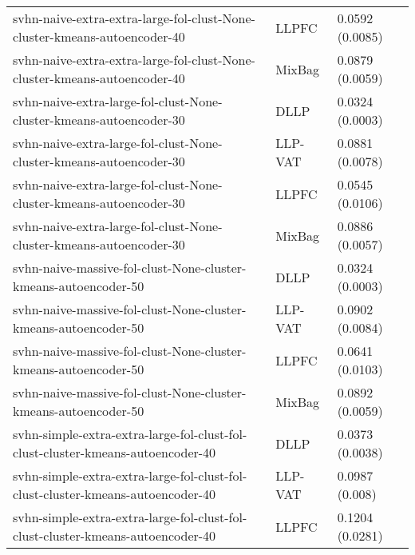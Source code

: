 \begin{longtable}{lll}
                                    svhn-naive-extra-extra-large-fol-clust-None-cluster-kmeans-autoencoder-40 &     LLPFC &                       0.0592 (0.0085) \\
                                    svhn-naive-extra-extra-large-fol-clust-None-cluster-kmeans-autoencoder-40 &    MixBag &                       0.0879 (0.0059) \\
                                          svhn-naive-extra-large-fol-clust-None-cluster-kmeans-autoencoder-30 &      DLLP &                       0.0324 (0.0003) \\
                                          svhn-naive-extra-large-fol-clust-None-cluster-kmeans-autoencoder-30 &   LLP-VAT &                       0.0881 (0.0078) \\
                                          svhn-naive-extra-large-fol-clust-None-cluster-kmeans-autoencoder-30 &     LLPFC &                       0.0545 (0.0106) \\
                                          svhn-naive-extra-large-fol-clust-None-cluster-kmeans-autoencoder-30 &    MixBag &                       0.0886 (0.0057) \\
                                              svhn-naive-massive-fol-clust-None-cluster-kmeans-autoencoder-50 &      DLLP &                       0.0324 (0.0003) \\
                                              svhn-naive-massive-fol-clust-None-cluster-kmeans-autoencoder-50 &   LLP-VAT &                       0.0902 (0.0084) \\
                                              svhn-naive-massive-fol-clust-None-cluster-kmeans-autoencoder-50 &     LLPFC &                       0.0641 (0.0103) \\
                                              svhn-naive-massive-fol-clust-None-cluster-kmeans-autoencoder-50 &    MixBag &                       0.0892 (0.0059) \\
                              svhn-simple-extra-extra-large-fol-clust-fol-clust-cluster-kmeans-autoencoder-40 &      DLLP &                       0.0373 (0.0038) \\
                              svhn-simple-extra-extra-large-fol-clust-fol-clust-cluster-kmeans-autoencoder-40 &   LLP-VAT &                        0.0987 (0.008) \\
                              svhn-simple-extra-extra-large-fol-clust-fol-clust-cluster-kmeans-autoencoder-40 &     LLPFC &                       0.1204 (0.0281) \\

\end{longtable}
